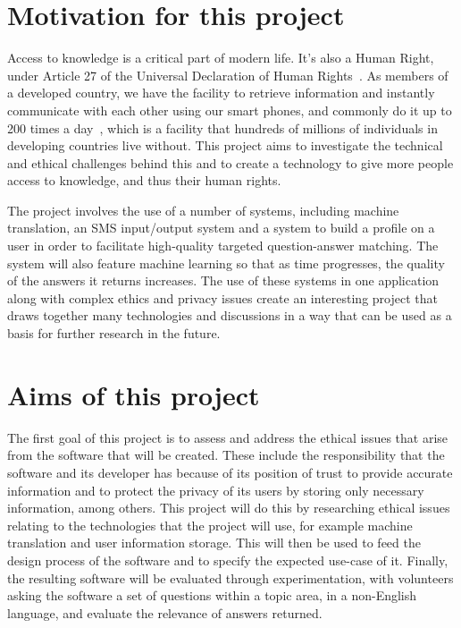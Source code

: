 \documentclass[authoryearcitations]{UoYCSproject}
\begin{document}
\section{Motivation for this project}
Access to knowledge is a critical part of modern life.  It's also a Human Right, under Article 27 of the Universal Declaration of Human Rights~\cite{community1948universal}.  As members of a developed country, we have the facility to retrieve information and instantly communicate with each other using our smart phones, and commonly do it up to 200 times a day~\cite{falaki}, which is a facility that hundreds of millions of individuals in developing countries live without.  This project aims to investigate the technical and ethical challenges behind this and to create a technology to give more people access to knowledge, and thus their human rights.

The project involves the use of a number of systems, including machine translation, an SMS input/output system and a system to build a profile on a user in order to facilitate high-quality targeted question-answer matching.  The system will also feature machine learning so that as time progresses, the quality of the answers it returns increases.  The use of these systems in one application along with complex ethics and privacy issues create an interesting project that draws together many technologies and discussions in a way that can be used as a basis for further research in the future.

\section{Aims of this project}
\label{sec:introAimsOfThisProject}

The first goal of this project is to assess and address the ethical issues that arise from the software that will be created.  These include the responsibility that the software and its developer has because of its position of trust to provide accurate information and to protect the privacy of its users by storing only necessary information, among others.  This project will do this by researching ethical issues relating to the technologies that the project will use, for example machine translation and user information storage.  This will then be used to feed the design process of the software and to specify the expected use-case of it.  Finally, the resulting software will be evaluated through experimentation, with volunteers asking the software a set of questions within a topic area, in a non-English language, and evaluate the relevance of answers returned.
\end{document}
